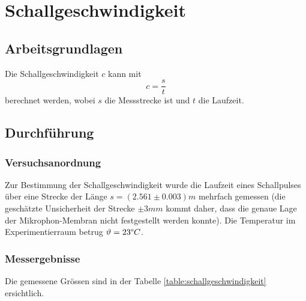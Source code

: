 \section{Schallgeschwindigkeit}

\subsection{Arbeitsgrundlagen}

Die Schallgeschwindigkeit $c$ kann mit
\[c=\frac{s}{t}\]
berechnet werden, wobei $s$ die Messstrecke ist und $t$ die Laufzeit.


\subsection{Durchf\"{u}hrung}

\subsubsection*{Versuchsanordnung}

Zur Bestimmung der Schallgeschwindigkeit wurde die Laufzeit eines Schallpulses \"{u}ber eine Strecke
der L\"{a}nge $s = (2.561 \pm 0.003) m$ mehrfach gemessen (die gesch\"{a}tzte Unsicherheit der Strecke $\pm 3 mm$
kommt daher, dass die genaue Lage der Mikrophon-Membran nicht festgestellt werden konnte). Die
Temperatur im Experimentierraum betrug $\vartheta=23 \degree C$.


\subsubsection*{Messergebnisse}

Die gemessene Gr\"ossen sind in der Tabelle \ref{table:schallgeschwindigkeit} ersichtlich.

